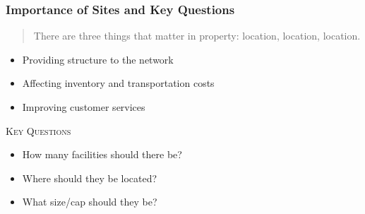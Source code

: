 \documentclass[10pt,handout,notes=show]{beamer}
\begin{document}
\begin{frame}
  \frametitle{Importance of Sites and Key Questions}

  \begin{center}
    \begin{minipage}{0.75\linewidth}
    \begin{quotation}
      There are three things that matter in property: location, location, location.
    \end{quotation}
    \end{minipage}
  \end{center}

  \NextHalfLine
  \begin{itemize}
      \item Providing structure to the network
      \item Affecting inventory and \alert{transportation costs}
      \item Improving customer services
  \end{itemize}

  \NextLine
  \textsc{Key Questions}
  \begin{itemize}
    \item \alert{How many} facilities should there be? 
    \item \alert{Where} should they be located? 
    \item What \alert{size/cap} should they be? 
  \end{itemize}


\end{frame}
\end{document}

